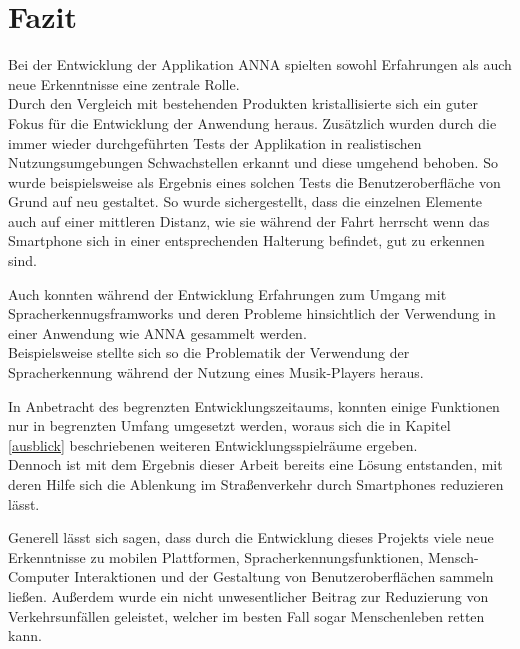 \chapter{Fazit}
Bei der Entwicklung der Applikation \ac{ANNA} spielten sowohl Erfahrungen als auch neue Erkenntnisse eine zentrale Rolle.\\
Durch den Vergleich mit bestehenden Produkten kristallisierte sich ein guter Fokus für die Entwicklung der Anwendung heraus. Zusätzlich wurden durch die immer wieder durchgeführten Tests der Applikation in realistischen Nutzungsumgebungen Schwachstellen erkannt und diese umgehend behoben. So wurde beispielsweise als Ergebnis eines solchen Tests die Benutzeroberfläche von Grund auf neu gestaltet. So wurde sichergestellt, dass die einzelnen Elemente auch auf einer mittleren Distanz, wie sie während der Fahrt herrscht wenn das Smartphone sich in einer entsprechenden Halterung befindet, gut zu erkennen sind.

Auch konnten während der Entwicklung Erfahrungen zum Umgang mit Spracherkennugsframworks und deren Probleme hinsichtlich der Verwendung in einer Anwendung wie \ac{ANNA} gesammelt werden.\\
Beispielsweise stellte sich so die Problematik der Verwendung der Spracherkennung während der Nutzung eines Musik-Players heraus.

In Anbetracht des begrenzten Entwicklungszeitaums, konnten einige Funktionen nur in begrenzten Umfang umgesetzt werden, woraus sich die in Kapitel \ref{ausblick} beschriebenen weiteren Entwicklungsspielräume ergeben.\\
Dennoch ist mit dem Ergebnis dieser Arbeit bereits eine Lösung entstanden, mit deren Hilfe sich die Ablenkung im Straßenverkehr durch Smartphones reduzieren lässt.

Generell lässt sich sagen, dass durch die Entwicklung dieses Projekts viele neue Erkenntnisse zu mobilen Plattformen, Spracherkennungsfunktionen, Mensch-Computer Interaktionen und der Gestaltung von Benutzeroberflächen sammeln ließen. Außerdem wurde ein nicht unwesentlicher Beitrag zur Reduzierung von Verkehrsunfällen geleistet, welcher im besten Fall sogar Menschenleben retten kann. 
